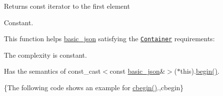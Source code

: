  \begin{DoxyReturn}{Returns}
const iterator to the first element
\end{DoxyReturn}
Constant.

This function helps {\ttfamily \hyperlink{classnlohmann_1_1basic__json}{basic\-\_\-json}} satisfying the \href{http://en.cppreference.com/w/cpp/concept/Container}{\tt Container} requirements\-:
\begin{DoxyItemize}
\item The complexity is constant.
\item Has the semantics of {\ttfamily const\-\_\-cast$<$const \hyperlink{classnlohmann_1_1basic__json}{basic\-\_\-json}\&$>$($\ast$this).\hyperlink{classnlohmann_1_1basic__json_ad4e381c54039607be08d7af41a1f6ad1}{begin()}}.
\end{DoxyItemize}

\{The following code shows an example for {\ttfamily \hyperlink{classnlohmann_1_1basic__json_a7355a41b0033ff8a27d58550544d5a59}{cbegin()}}.,cbegin\}


